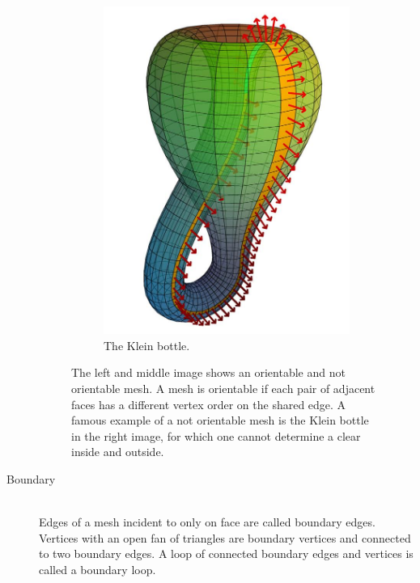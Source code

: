 \begin{description}
\begin{figure}[h]
\begin{subfigure}[b]{0.3\textwidth}
			\includegraphics[width=\textwidth]{images/klein_bottle}
			\caption{The Klein bottle.}
			\label{fig:klein_bottle}
		\end{subfigure}
		\caption{
			The left and middle image shows an orientable and not orientable mesh.
			A mesh is orientable if each pair of adjacent faces has a different vertex order on the shared edge.
			A famous example of a not orientable mesh is the Klein bottle in the right image, for which one cannot determine a clear inside and outside.
		}
		\label{fig:orientable_mesh}
	\end{figure}
	
	
	\item[Boundary] \hfill \\
	Edges of a mesh incident to only on face are called boundary edges.
	Vertices with an open fan of triangles are boundary vertices and connected to two boundary edges.
	A loop of connected boundary edges and vertices is called a boundary loop.
	

\end{description}

